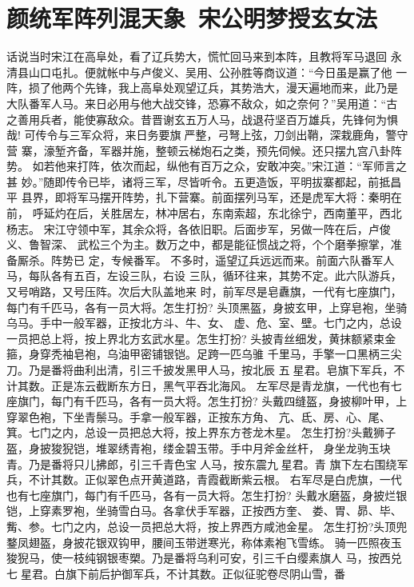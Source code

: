 \chapter{颜统军阵列混天象~宋公明梦授玄女法}

话说当时宋江在高阜处，看了辽兵势大，慌忙回马来到本阵，且教将军马退回
永清县山口屯扎。便就帐中与卢俊义、吴用、公孙胜等商议道：“今日虽是赢了他
一阵，损了他两个先锋，我上高阜处观望辽兵，其势浩大，漫天遍地而来，此乃是
大队番军人马。来日必用与他大战交锋，恐寡不敌众，如之奈何？”吴用道：“古
之善用兵者，能使寡敌众。昔晋谢玄五万人马，战退苻坚百万雄兵，先锋何为惧哉!
可传令与三军众将，来日务要旗严整，弓弩上弦，刀剑出鞘，深栽鹿角，警守营
寨，濠堑齐备，军器并施，整顿云梯炮石之类，预先伺候。还只摆九宫八卦阵势。
如若他来打阵，依次而起，纵他有百万之众，安敢冲突。”宋江道：“军师言之甚
妙。”随即传令已毕，诸将三军，尽皆听令。五更造饭，平明拔寨都起，前抵昌平
县界，即将军马摆开阵势，扎下营寨。前面摆列马军，还是虎军大将：秦明在前，
呼延灼在后，关胜居左，林冲居右，东南索超，东北徐宁，西南董平，西北杨志。
宋江守领中军，其余众将，各依旧职。后面步军，另做一阵在后，卢俊义、鲁智深、
武松三个为主。数万之中，都是能征惯战之将，个个磨拳擦掌，准备厮杀。阵势已
定，专候番军。
不多时，遥望辽兵远远而来。前面六队番军人马，每队各有五百，左设三队，右设
三队，循环往来，其势不定。此六队游兵，又号哨路，又号压阵。次后大队盖地来
时，前军尽是皂纛旗，一代有七座旗门，每门有千匹马，各有一员大将。怎生打扮?
头顶黑盔，身披玄甲，上穿皂袍，坐骑乌马。手中一般军器，正按北方斗、牛、女、
虚、危、室、壁。七门之内，总设一员把总上将，按上界北方玄武水星。怎生打扮?
头披青丝细发，黄抹额紧束金箍，身穿秃袖皂袍，乌油甲密铺银铠。足跨一匹乌骓
千里马，手擎一口黑柄三尖刀。乃是番将曲利出清，引三千披发黑甲人马，按北辰
五星君。皂旗下军兵，不计其数。正是冻云截断东方日，黑气平吞北海风。
左军尽是青龙旗，一代也有七座旗门，每门有千匹马，各有一员大将。怎生打扮?
头戴四缝盔，身披柳叶甲，上穿翠色袍，下坐青鬃马。手拿一般军器，正按东方角、
亢、氐、房、心、尾、箕。七门之内，总设一员把总大将，按上界东方苍龙木星。
怎生打扮?头戴狮子盔，身披狻猊铠，堆翠绣青袍，缕金碧玉带。手中月斧金丝杆，
身坐龙驹玉块青。乃是番将只儿拂郎，引三千青色宝人马，按东震九星君。青
旗下左右围绕军兵，不计其数。正似翠色点开黄道路，青霞截断紫云根。
右军尽是白虎旗，一代也有七座旗门，每门有千匹马，各有一员大将。怎生打扮?
头戴水磨盔，身披烂银铠，上穿素罗袍，坐骑雪白马。各拿伏手军器，正按西方奎、
娄、胃、昴、毕、觜、参。七门之内，总设一员把总大将，按上界西方咸池金星。
怎生打扮?头顶兜鍪凤翅盔，身披花银双钩甲，腰间玉带迸寒光，称体素袍飞雪练。
骑一匹照夜玉狻猊马，使一枝纯钢银枣槊。乃是番将乌利可安，引三千白缨素旗人
马，按西兑七星君。白旗下前后护御军兵，不计其数。正似征驼卷尽阴山雪，番

